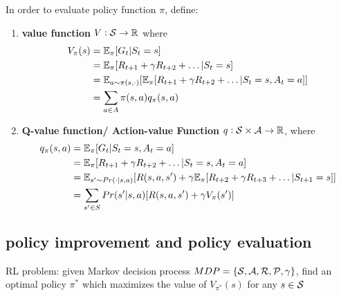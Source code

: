 \documentclass[11pt]{article}
\begin{document}
In order to evaluate policy function \(\pi\), define:
\begin{enumerate}
\item \textbf{value function} \(V:\mathcal{S}\to\mathbb{R}\) where 
\begin{align*}
V_\pi(s)&=\mathbb{E}_\pi[G_t|S_t=s]\\
&=\mathbb{E}_\pi[R_{t+1}+\gamma R_{t+2}+\dots|S_t=s]\\
&=\mathbb{E}_{a\sim\pi(s,\cdot)}[\mathbb{E}_\pi[R_{t+1}+\gamma R_{t+2}+\dots|S_t=s,A_t=a]]\\
&=\displaystyle\sum_{a\in A}\pi(s,a)q_\pi(s,a)
\end{align*}
\item \textbf{Q-value function/ Action-value Function} \(q:\mathcal{S}\times\mathcal{A}\to\mathbb{R}\), where
\begin{align*}
q_\pi(s,a)&=\mathbb{E}_\pi[G_t|S_t=s,A_t=a]\\
&=\mathbb{E}_\pi[R_{t+1}+\gamma R_{t+2}+\dots|S_t=s,A_t=a]\\
&=\mathbb{E}_{s'\sim Pr(\cdot|s,a)}[R(s,a,s')+\gamma
\mathbb{E}_\pi[R_{t+2}+\gamma R_{t+3}+\dots|S_{t+1}=s]]\\
&=\displaystyle\sum_{s'\in S}Pr(s'|s,a)[R(s,a,s')+\gamma V_\pi(s')]
\end{align*}
\end{enumerate}
\subsection{policy improvement and policy evaluation}
\label{sec:org7c9d1fc}
RL problem: given Markov decision process
\(MDP=\{\mathcal{S},\mathcal{A},\mathcal{R},\mathcal{P},\gamma\}\), find an optimal policy \(\pi^*\)
which maximizes the value of \(V_{\pi^*}(s)\) for any \(s\in\mathcal{S}\)
\end{document}
